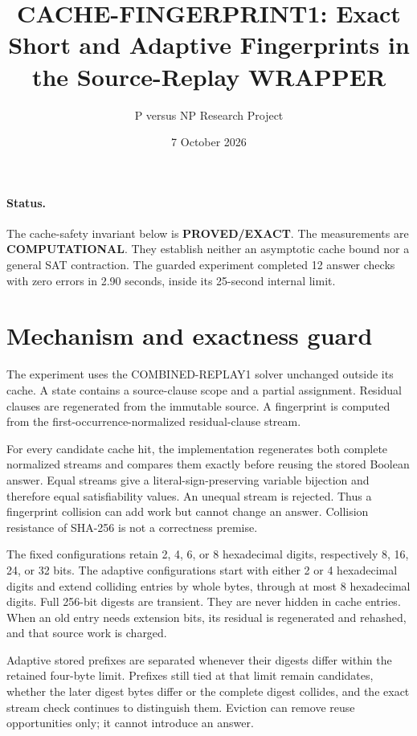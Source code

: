 \documentclass[11pt]{article}
\title{CACHE-FINGERPRINT1: Exact Short and Adaptive Fingerprints in the Source-Replay WRAPPER}
\author{P versus NP Research Project}
\date{7 October 2026}
\begin{document}
\maketitle

\paragraph{Status.}
The cache-safety invariant below is \textbf{PROVED/EXACT}.  The measurements
are \textbf{COMPUTATIONAL}.  They establish neither an asymptotic cache bound
nor a general SAT contraction.  The guarded experiment completed 12 answer
checks with zero errors in 2.90 seconds, inside its 25-second internal limit.

\section{Mechanism and exactness guard}
The experiment uses the COMBINED-REPLAY1 solver unchanged outside its cache.
A state contains a source-clause scope and a partial assignment.  Residual
clauses are regenerated from the immutable source.  A fingerprint is computed
from the first-occurrence-normalized residual-clause stream.

For every candidate cache hit, the implementation regenerates both complete
normalized streams and compares them exactly before reusing the stored Boolean
answer.  Equal streams give a literal-sign-preserving variable bijection and
therefore equal satisfiability values.  An unequal stream is rejected.  Thus a
fingerprint collision can add work but cannot change an answer.  Collision
resistance of SHA-256 is not a correctness premise.

The fixed configurations retain 2, 4, 6, or 8 hexadecimal digits, respectively
8, 16, 24, or 32 bits.  The adaptive configurations start with either 2 or 4
hexadecimal digits and extend colliding entries by whole bytes, through at
most 8 hexadecimal digits.  Full 256-bit digests are transient.  They are
never hidden in cache entries.  When an old entry needs extension bits, its
residual is regenerated and rehashed, and that source work is charged.

Adaptive stored prefixes are separated whenever their digests differ within
the retained four-byte limit.  Prefixes still tied at that limit remain
candidates, whether the later digest bytes differ or the complete digest
collides, and the exact stream check continues to distinguish them.
Eviction can remove reuse opportunities only; it cannot introduce an answer.
\end{document}
